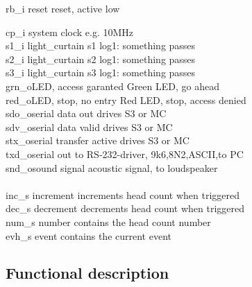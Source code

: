 \documentclass[12pt,a4 paper] {article}
\begin{document}
\begin{flushleft}
	rb\_i \hspace{1cm} reset \hfill reset, active low
\end{flushleft} 
cp\_i \hspace{1cm} system clock \hfill e.g. 10MHz \\
s1\_i \hspace{1cm} light\_curtain s1 \hfill log1: something passes \\
s2\_i \hspace{1cm} light\_curtain s2 \hfill log1: something passes \\
s3\_i \hspace{1cm} light\_curtain s3 \hfill log1: something passes \\
grn\_o\hspace{0.9cm}LED, access garanted \hfill Green LED, go ahead \\
red\_o\hspace{0.9cm}LED, stop, no entry \hfill Red LED, stop, access denied \\
sdo\_o\hspace{0.9cm}serial data out \hfill drives S3 or MC\\
sdv\_o\hspace{0.9cm}serial data valid \hfill drives S3 or MC\\
stx\_o\hspace{1cm}serial transfer active \hfill drives S3 or MC\\
txd\_o\hspace{1cm}serial out \hfill to RS-232-driver, 9k6,8N2,ASCII,to PC\\
snd\_o\hspace{0.9cm}sound signal \hfill acoustic signal, to loudspeaker\\
\\
inc\_s \hspace{0.9cm} increment \hfill increments head count when triggered\\
dec\_s \hspace{0.8cm} decrement \hfill decrements head count when triggered\\
num\_s \hspace{0.6cm} number \hfill contains the head count number\\
evh\_s \hspace{0.8cm} event \hfill contains the current event\\

\subsection{Functional description}
\end{document}
